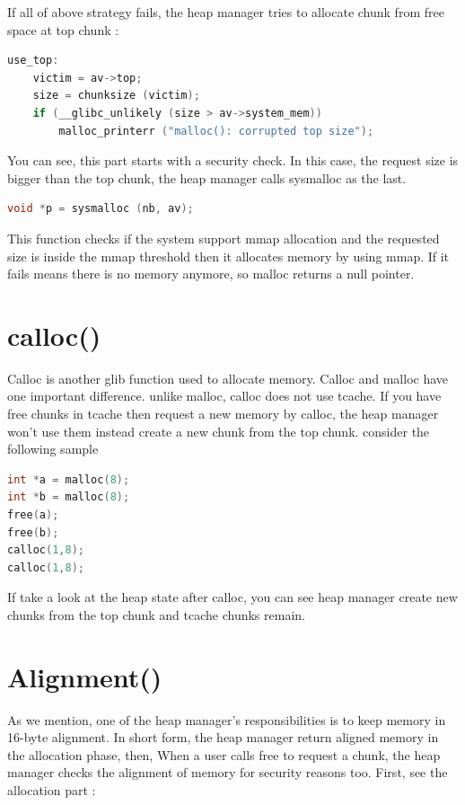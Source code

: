 \documentclass{masterthesis}
\newcommand*\tch{tcache}
\begin{document}
If all of above strategy fails, the heap manager tries to allocate chunk from free space at top chunk :

\begin{lstlisting}[language=c,frame=tlrb]
use_top:
	victim = av->top;
	size = chunksize (victim);
	if (__glibc_unlikely (size > av->system_mem))
		malloc_printerr ("malloc(): corrupted top size");
\end{lstlisting}

You can see, this part starts with a security check. In this case, the request size is bigger than the top chunk, the heap manager calls sysmalloc as the last.

\begin{lstlisting}[language=c,frame=tlrb]
 void *p = sysmalloc (nb, av);
 \end{lstlisting}

This function checks if the system support mmap allocation and the requested size is inside the mmap threshold then it allocates memory by using mmap. If it fails means there is no memory anymore, so malloc returns a null pointer.

\section{calloc()}
Calloc is another glib function used to allocate memory. Calloc and malloc have one important difference. unlike malloc, calloc does not use \tch{}. If you have free chunks in \tch{} then request a new memory by calloc, the heap manager won't use them instead create a new chunk from the top chunk. consider the following sample 

\begin{lstlisting}[language=c,frame=tlrb]
int *a = malloc(8);
int *b = malloc(8);
free(a);
free(b);
calloc(1,8);
calloc(1,8);
\end{lstlisting}

If take a look at the heap state after calloc, you can see heap manager create new chunks from the top chunk and \tch{} chunks remain.

\section{Alignment()}
As we mention, one of the heap manager's responsibilities is to keep memory in 16-byte alignment. In short form, the heap manager return aligned memory in the allocation phase, then, When a user calls free to request a chunk, the heap manager checks the alignment of memory for security reasons too. First, see the allocation part :
\end{document}
